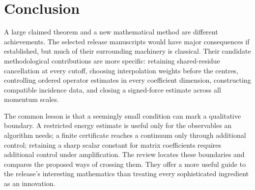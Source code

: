 \section{Conclusion}
A large claimed theorem and a new mathematical method are different
achievements. The selected release manuscripts would have major
consequences if established, but much of their surrounding machinery is
classical. Their candidate methodological contributions are more
specific: retaining shared-residue cancellation at every cutoff,
choosing interpolation weights before the centres, controlling ordered
operator estimates in every coefficient dimension, constructing
compatible incidence data, and closing a signed-force estimate across
all momentum scales.

The common lesson is that a seemingly small condition can mark a
qualitative boundary. A restricted energy estimate is useful only for
the observables an algorithm needs; a finite certificate reaches a
continuum only through additional control; retaining a sharp scalar
constant for matrix coefficients requires additional control under
amplification.
The review locates these boundaries and compares the proposed ways of
crossing them. They offer a more useful guide to the release's interesting
mathematics than treating every sophisticated ingredient as an innovation.
